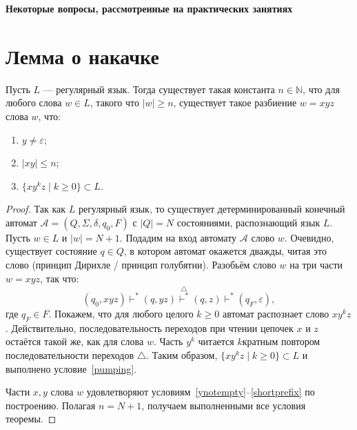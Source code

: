 % 

\rfoot{}


\begin{center}
{\bfseries\Large Некоторые вопросы, рассмотренные на практических занятиях}
\end{center}
\section{Лемма о накачке}
\begin{Thm} Пусть $L$ — регулярный язык.
Тогда существует такая константа $n\in \mathbb N$, что для любого слова $w \in L$,
такого что $|w|\geqslant n$, существует такое разбиение $w=xyz$ слова $w$, что:
\begin{enumerate}
  \item\label{ynotempty} $y \neq \varepsilon$;
  \item\label{shortprefix} $|xy| \leqslant n$;
  \item\label{pumping} $\{ xy^kz \mid k \geqslant 0\} \subset L$.
\end{enumerate} 
\end{Thm}
\begin{proof}
Так как $L$ регулярный язык, то существует детерминированный конечный автомат
$\mathcal A=(Q, \Sigma, \delta, q_0, F)$ с $|Q|=N$ состояниями, распознающий
язык $L$. Пусть $w \in L$ и $|w|=N+1$. Подадим на вход автомату $\mathcal A$
слово $w$. Очевидно, существует состояние $q \in Q$, в котором автомат окажется 
дважды, читая это слово (принцип Дирихле / принцип голубятни). Разобьём слово
$w$ на три части $w=xyz$, так что: $$
    (q_0, xyz) \vdash^*  (q, yz) \stackrel{\bigtriangleup}{\vdash^*} (q, z)
    \vdash^* (q_F, \varepsilon), 
$$
где $q_F \in F$. Покажем, что для любого целого $k \geqslant 0$ автомат
распознает слово $xy^kz$. Действительно, последовательность переходов при чтении
цепочек $x$ и $z$ остаётся такой же, как для слова $w$. Часть $y^k$ читается
$k$\nbdash{}кратным повтором последовательности переходов $\bigtriangleup$. Таким
образом, $\{ xy^kz \mid k \geqslant 0\} \subset L$ и выполнено
условие~\eqref{pumping}.

Части $x, y$ слова $w$ удовлетворяют
условиям~\eqref{ynotempty}–\eqref{shortprefix} по построению. Полагая
$n=N+1$, получаем выполненными все условия теоремы.
\end{proof}

